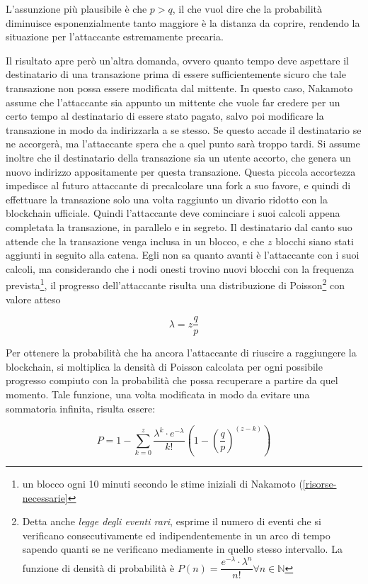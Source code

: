 L'assunzione più plausibile è che $p > q$, il che vuol dire che la probabilità diminuisce esponenzialmente tanto maggiore è la distanza da coprire, rendendo la situazione per l'attaccante estremamente precaria.

Il risultato apre però un'altra domanda, ovvero quanto tempo deve aspettare il destinatario di una transazione prima di essere sufficientemente sicuro che tale transazione non possa essere modificata dal mittente.
In questo caso, Nakamoto assume che l'attaccante sia appunto un mittente che vuole far credere per un certo tempo al destinatario di essere stato pagato, salvo poi modificare la transazione in modo da indirizzarla a se stesso. Se questo accade il destinatario se ne accorgerà, ma l'attaccante spera che a quel punto sarà troppo tardi.
Si assume inoltre che il destinatario della transazione sia un utente accorto, che genera un nuovo indirizzo appositamente per questa transazione. Questa piccola accortezza impedisce al futuro attaccante di precalcolare una fork a suo favore, e quindi di effettuare la transazione solo una volta raggiunto un divario ridotto con la blockchain ufficiale. Quindi l'attaccante deve cominciare i suoi calcoli appena completata la transazione, in parallelo e in segreto.
Il destinatario dal canto suo attende che la transazione venga inclusa in un blocco, e che $z$ blocchi siano stati aggiunti in seguito alla catena. Egli non sa quanto avanti è l'attaccante con i suoi calcoli, ma considerando che i nodi onesti trovino nuovi blocchi con la frequenza prevista\footnote{un blocco ogni 10 minuti secondo le stime iniziali di Nakamoto (\ref{risorse-necessarie}}, il progresso dell'attaccante risulta una distribuzione di Poisson\footnote{Detta anche \emph{legge degli eventi rari}, esprime il numero di eventi che si verificano consecutivamente ed indipendentemente in un arco di tempo sapendo quanti se ne verificano mediamente in quello stesso intervallo. La funzione di densità di probabilità è $P(n) = \dfrac{e^{-\lambda} \cdot \lambda^n}{n!} \forall n \in \mathbb{N}$} con valore atteso

\[
\lambda = z \frac{q}{p}
\]

Per ottenere la probabilità che ha ancora l'attaccante di riuscire a raggiungere la blockchain, si moltiplica la densità di Poisson calcolata per ogni possibile progresso compiuto con la probabilità che possa recuperare a partire da quel momento. Tale funzione, una volta modificata in modo da evitare una sommatoria infinita, risulta essere:

\[
P = 1 - \sum^z_{k=0} \frac{\lambda^k \cdot e^{-\lambda}}{k!} \left( 1 - \left( \frac{q}{p} \right)^{\left( z - k \right)} \right)
\]

